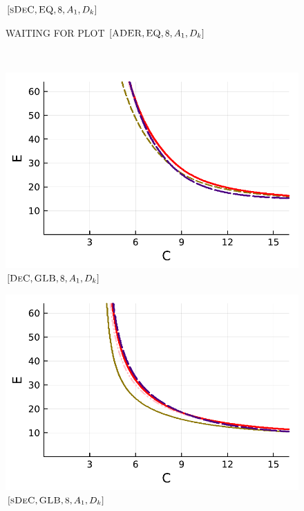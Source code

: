 \begin{figure}[!h]
\begin{minipage}[t]{0.32\textwidth}
		\centering
		$[\textsc{sDeC},\textsc{EQ}, 8, A_1,D_k]$
	\end{minipage}
	\begin{minipage}[t]{0.32\textwidth}
		WAITING FOR PLOT
		\centering
		$[\textsc{ADER},\textsc{EQ}, 8, A_1,D_k]$
	\end{minipage}\\
	\begin{minipage}[t]{0.32\textwidth}
		\includegraphics[width=\textwidth]{pdf/pdepics/diff/IMEXDeC_gaussLobatto_diff_ord_2468.pdf}
		\centering
		$[\textsc{DeC},\textsc{GLB}, 8, A_1,D_k]$
	\end{minipage} 
	\begin{minipage}[t]{0.32\textwidth}
		\includegraphics[width=\textwidth]{pdf/pdepics/diff/IMEXDeC_subtimesteps_gaussLobatto_diff_ord_2468.pdf}
		\centering
		$[\textsc{sDeC},\textsc{GLB}, 8, A_1,D_k]$
	\end{minipage}

\end{figure}
